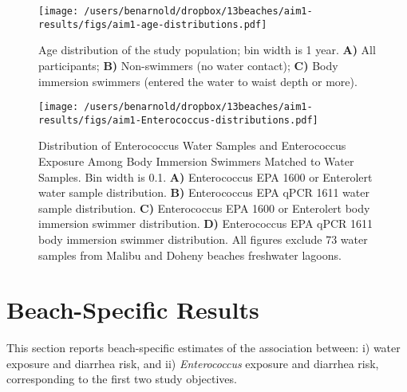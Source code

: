 \documentclass[12pt]{article}\usepackage[]{graphicx}\usepackage[]{color}
\begin{document}
\begin{figure}
\begin{center}
\texttt{[image: /users/benarnold/dropbox/13beaches/aim1-results/figs/aim1-age-distributions.pdf]}
\caption{Age distribution of the study population; bin width is 1 year. \textbf{A)} All participants; \textbf{B)} Non-swimmers (no water contact); \textbf{C)} Body immersion swimmers (entered the water to waist depth or more). \label{fig:agedist}}
\end{center}
\end{figure}


\begin{figure}
\begin{center}
\texttt{[image: /users/benarnold/dropbox/13beaches/aim1-results/figs/aim1-Enterococcus-distributions.pdf]}
\caption{Distribution of Enterococcus Water Samples and Enterococcus Exposure Among Body Immersion Swimmers Matched to Water Samples. Bin width is 0.1.  \textbf{A)} Enterococcus EPA 1600 or Enterolert water sample distribution. \textbf{B)} Enterococcus EPA qPCR 1611 water sample distribution. \textbf{C)} Enterococcus EPA 1600 or Enterolert body immersion swimmer distribution. \textbf{D)} Enterococcus EPA qPCR 1611 body immersion swimmer distribution.  All figures exclude 73 water samples from Malibu and Doheny beaches freshwater lagoons.
\label{fig:enterodist}}
\end{center}
\end{figure}



\clearpage
\setcounter{table}{0}
\setcounter{figure}{0}
\section{Beach-Specific Results}



This section reports beach-specific estimates of the association between: i) water exposure and diarrhea risk, and ii) \emph{Enterococcus} exposure and diarrhea risk, corresponding to the first two study objectives.
\end{document}
